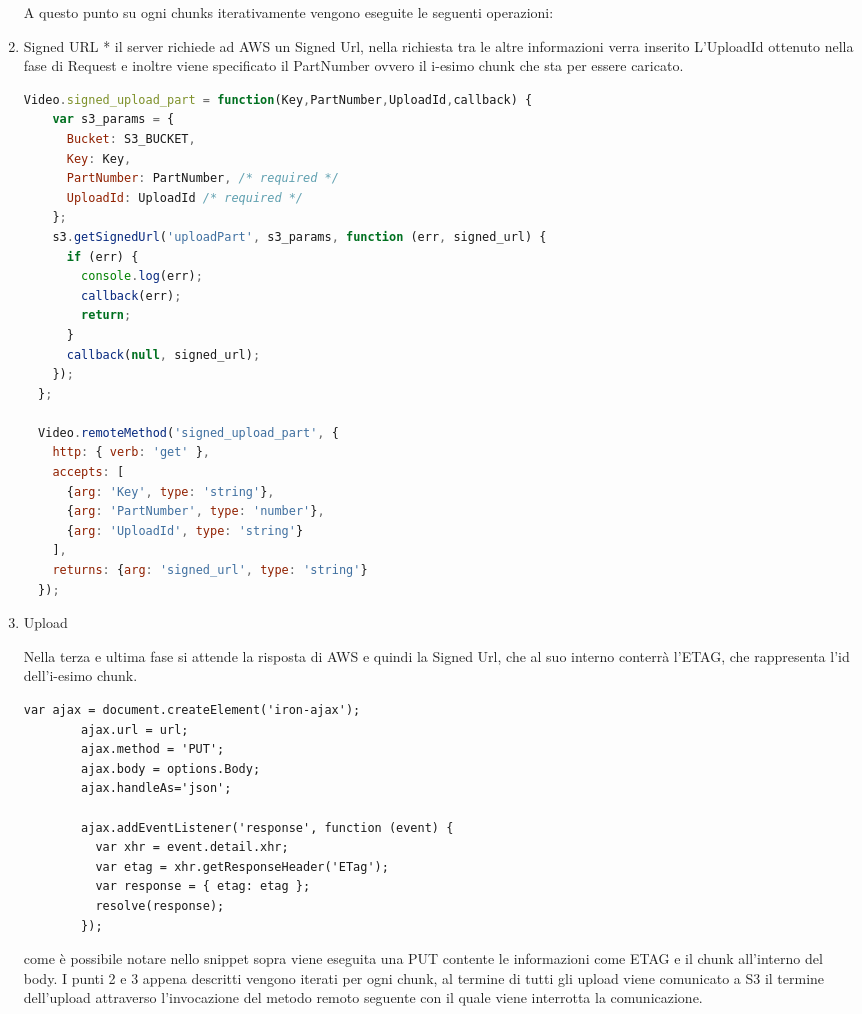 \begin{enumerate}
A questo punto su ogni chunks iterativamente vengono eseguite le seguenti operazioni:



\item {Signed URL}
  * il server richiede ad AWS un Signed Url, nella richiesta tra le altre informazioni    verra inserito L’UploadId ottenuto nella fase di Request e inoltre viene specificato il     PartNumber ovvero il i-esimo chunk che sta per essere caricato.
\begin{lstlisting}[language=javascript]
  Video.signed_upload_part = function(Key,PartNumber,UploadId,callback) {
    var s3_params = {
      Bucket: S3_BUCKET,
      Key: Key,
      PartNumber: PartNumber, /* required */
      UploadId: UploadId /* required */
    };
    s3.getSignedUrl('uploadPart', s3_params, function (err, signed_url) {
      if (err) {
        console.log(err);
        callback(err);
        return;
      }
      callback(null, signed_url);
    });
  };

  Video.remoteMethod('signed_upload_part', {
    http: { verb: 'get' },
    accepts: [
      {arg: 'Key', type: 'string'},
      {arg: 'PartNumber', type: 'number'},
      {arg: 'UploadId', type: 'string'}
    ],
    returns: {arg: 'signed_url', type: 'string'}
  });
\end{lstlisting}

\item {Upload}

Nella terza e ultima fase si attende la risposta di AWS e quindi la Signed Url, che al suo interno conterrà l’ETAG, che rappresenta l’id dell’i-esimo chunk.
\begin{lstlisting}[language=html]
var ajax = document.createElement('iron-ajax');
        ajax.url = url;
        ajax.method = 'PUT';
        ajax.body = options.Body;
        ajax.handleAs='json';

        ajax.addEventListener('response', function (event) {
          var xhr = event.detail.xhr;
          var etag = xhr.getResponseHeader('ETag');
          var response = { etag: etag };
          resolve(response);
        });
\end{lstlisting}

come è possibile notare nello snippet sopra viene eseguita una PUT  contente le informazioni come ETAG e il chunk all’interno del body.
I punti 2 e 3 appena descritti vengono iterati per ogni chunk, al termine di tutti gli upload viene comunicato a S3 il termine dell’upload attraverso l’invocazione del metodo remoto seguente con il quale viene interrotta la comunicazione.


\end{enumerate}
